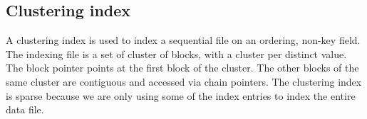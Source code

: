 \documentclass[a4paper, openany]{memoir}
\begin{document}
            
            
            

\subsection{Clustering index}
A clustering index is used to index a sequential file on an ordering, non-key field. The indexing file is a set of cluster of blocks, with a cluster per distinct value. The block pointer points at the first block of the cluster. The other blocks of the same cluster are contiguous and accessed via chain pointers. The clustering index is sparse because we are only using some of the index entries to index the entire data file.
\end{document}
